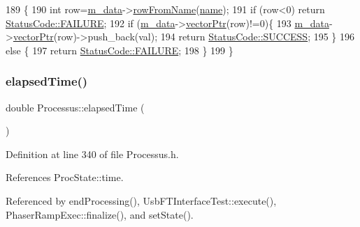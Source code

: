 \begin{DoxyCode}
189                                                  \{
190     \textcolor{keywordtype}{int} row=\hyperlink{classProcessus_a3da9a9de8af54e2f47807a3e09dfccff}{m\_data}->\hyperlink{classData_a72f9afe0edb22ad39871292f9f4d3d38}{rowFromName}(\hyperlink{classObject_a300f4c05dd468c7bb8b3c968868443c1}{name});
191     \textcolor{keywordflow}{if} (row<0) \textcolor{keywordflow}{return} \hyperlink{classStatusCode_a6f565cbeadc76d14c72f047e5e85eb4ba3da73d4c469762eb9d3c960368252b26}{StatusCode::FAILURE};
192     \textcolor{keywordflow}{if} (\hyperlink{classProcessus_a3da9a9de8af54e2f47807a3e09dfccff}{m\_data}->\hyperlink{classData_aa2153cb57f6f1a67b54eafe5582e0b6b}{vectorPtr}(row)!=0)\{
193       \hyperlink{classProcessus_a3da9a9de8af54e2f47807a3e09dfccff}{m\_data}->\hyperlink{classData_aa2153cb57f6f1a67b54eafe5582e0b6b}{vectorPtr}(row)->push\_back(val);
194       \textcolor{keywordflow}{return} \hyperlink{classStatusCode_a6f565cbeadc76d14c72f047e5e85eb4badd0da38d3ba0d922efd1f4619bc37ad8}{StatusCode::SUCCESS};
195     \}
196     \textcolor{keywordflow}{else} \{
197       \textcolor{keywordflow}{return} \hyperlink{classStatusCode_a6f565cbeadc76d14c72f047e5e85eb4ba3da73d4c469762eb9d3c960368252b26}{StatusCode::FAILURE};
198     \}
199   \}
\end{DoxyCode}
\mbox{\label{classProcessus_aecca96218c65bc805c988cd95447df55}} 
\subsubsection{\texorpdfstring{elapsed\+Time()}{elapsedTime()}\hspace{0.1cm}{\footnotesize\ttfamily [1/2]}}
{\footnotesize\ttfamily double Processus\+::elapsed\+Time (\begin{DoxyParamCaption}{ }\end{DoxyParamCaption})\hspace{0.3cm}{\ttfamily [inline]}}



Definition at line 340 of file Processus.\+h.



References Proc\+State\+::time.



Referenced by end\+Processing(), Usb\+F\+T\+Interface\+Test\+::execute(), Phaser\+Ramp\+Exec\+::finalize(), and set\+State().


